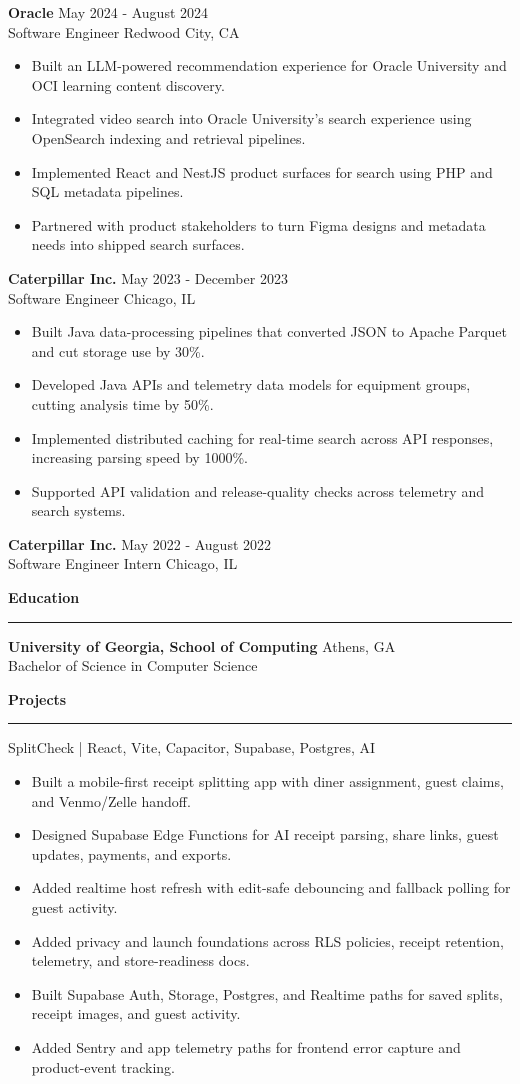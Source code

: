 \documentclass[letterpaper,10pt]{article}
\newcommand{\sectiontitle}[1]{\vspace{3pt}\textbf{\large #1}\vspace{1pt}\hrule\vspace{2pt}}
\newcommand{\role}[4]{\textbf{#1} \hfill #2\\#3 \hfill #4\vspace{-2pt}}
\newcommand{\project}[2]{#1 | #2\vspace{-2pt}}
\begin{document}
\role{Oracle}{May 2024 - August 2024}{Software Engineer}{Redwood City, CA}
\begin{itemize}
  \item Built an LLM-powered recommendation experience for Oracle University and OCI learning content discovery.
  \item Integrated video search into Oracle University's search experience using OpenSearch indexing and retrieval pipelines.
  \item Implemented React and NestJS product surfaces for search using PHP and SQL metadata pipelines.
  \item Partnered with product stakeholders to turn Figma designs and metadata needs into shipped search surfaces.
\end{itemize}

\role{Caterpillar Inc.}{May 2023 - December 2023}{Software Engineer}{Chicago, IL}
\begin{itemize}
  \item Built Java data-processing pipelines that converted JSON to Apache Parquet and cut storage use by 30\%.
  \item Developed Java APIs and telemetry data models for equipment groups, cutting analysis time by 50\%.
  \item Implemented distributed caching for real-time search across API responses, increasing parsing speed by 1000\%.
  \item Supported API validation and release-quality checks across telemetry and search systems.
\end{itemize}

\role{Caterpillar Inc.}{May 2022 - August 2022}{Software Engineer Intern}{Chicago, IL}

\sectiontitle{Education}
\textbf{University of Georgia, School of Computing} \hfill Athens, GA\\
Bachelor of Science in Computer Science

\sectiontitle{Projects}
\project{SplitCheck}{React, Vite, Capacitor, Supabase, Postgres, AI}
\begin{itemize}
  \item Built a mobile-first receipt splitting app with diner assignment, guest claims, and Venmo/Zelle handoff.
  \item Designed Supabase Edge Functions for AI receipt parsing, share links, guest updates, payments, and exports.
  \item Added realtime host refresh with edit-safe debouncing and fallback polling for guest activity.
  \item Added privacy and launch foundations across RLS policies, receipt retention, telemetry, and store-readiness docs.
  \item Built Supabase Auth, Storage, Postgres, and Realtime paths for saved splits, receipt images, and guest activity.
  \item Added Sentry and app telemetry paths for frontend error capture and product-event tracking.
\end{itemize}
\end{document}
